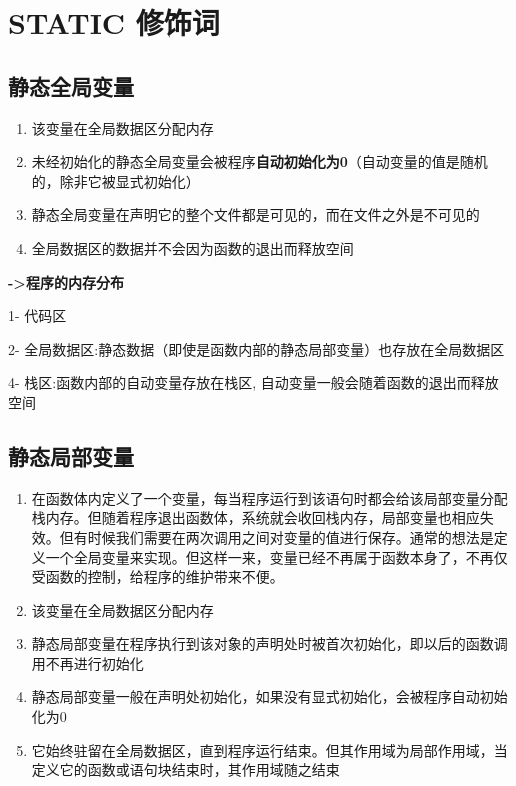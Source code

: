 \documentclass[UTF8,a4paper,12pt]{ctexbook} %
\begin{document}
\section{STATIC 修饰词}
	       
	\subsection{静态全局变量}	
		       \begin{enumerate}[fullwidth,itemindent=2em,label=(\arabic*)]
			       \item  该变量在全局数据区分配内存
		       
			       \item  未经初始化的静态全局变量会被程序\textbf{自动初始化为0}（自动变量的值是随机的，除非它被显式初始化）
		       
			       \item  静态全局变量在声明它的整个文件都是可见的，而在文件之外是不可见的
		       
			       \item  全局数据区的数据并不会因为函数的退出而释放空间
		       \end{enumerate}
			       \textbf{->程序的内存分布}
		       
			       \quad  \color{red} {1- 代码区}
		       
			       \quad  \color{violet} {2- 全局数据区:静态数据（即使是函数内部的静态局部变量）也存放在全局数据区}
		       
			       \quad  \color{blue}{3- 堆区:由new产生的动态数据存放在堆区}
		       
			       \quad  \color{orange} {4- 栈区:函数内部的自动变量存放在栈区, 自动变量一般会随着函数的退出而释放空间}
			       \color{black}
	\subsection{静态局部变量}
		       \begin{enumerate}[fullwidth,itemindent=2em,label=(\arabic*)]
			       \item  在函数体内定义了一个变量，每当程序运行到该语句时都会给该局部变量分配栈内存。但随着程序退出函数体，系统就会收回栈内存，局部变量也相应失效。但有时候我们需要在两次调用之间对变量的值进行保存。通常的想法是定义一个全局变量来实现。但这样一来，变量已经不再属于函数本身了，不再仅受函数的控制，给程序的维护带来不便。
		       
			       \item  该变量在全局数据区分配内存
		       
			       \item  静态局部变量在程序执行到该对象的声明处时被首次初始化，即以后的函数调用不再进行初始化
		       
			       \item  静态局部变量一般在声明处初始化，如果没有显式初始化，会被程序自动初始化为0
		       
			       \item  它始终驻留在全局数据区，直到程序运行结束。但其作用域为局部作用域，当定义它的函数或语句块结束时，其作用域随之结束
		       \end{enumerate}
\end{document}
